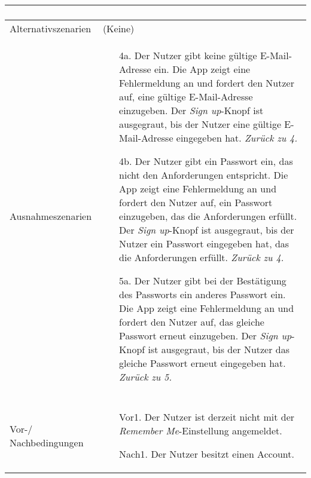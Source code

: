 \begin{table}[H]
\begin{tabularx}{0.95\textwidth}{ |l|X| }
\begin{enumerate}[noitemsep]
		                                         \end{enumerate}                                                                        \\
		\hline
		Alternativszenarien                    & (Keine)                                                                                                                                               \\
		\hline
		Ausnahmeszenarien                      & \begin{enumerate}[noitemsep]
			                                         \item[4a.] Der Nutzer gibt keine gültige E-Mail-Adresse ein.
				                                         \subitem[4a1.] Die App zeigt eine Fehlermeldung an und fordert den Nutzer auf, eine gültige E-Mail-Adresse einzugeben.
				                                         \subitem[4a2.] Der \emph{Sign up}-Knopf ist ausgegraut, bis der Nutzer eine gültige E-Mail-Adresse eingegeben hat. \emph{Zurück zu 4.}
			                                         \item[4b.] Der Nutzer gibt ein Passwort ein, das nicht den Anforderungen entspricht.
				                                         \subitem[4b1.] Die App zeigt eine Fehlermeldung an und fordert den Nutzer auf, ein Passwort einzugeben, das die Anforderungen erfüllt.
				                                         \subitem[4b2.] Der \emph{Sign up}-Knopf ist ausgegraut, bis der Nutzer ein Passwort eingegeben hat, das die Anforderungen erfüllt. \emph{Zurück zu 4.}
			                                         \item[5a.] Der Nutzer gibt bei der Bestätigung des Passworts ein anderes Passwort ein.
				                                         \subitem[5a1.] Die App zeigt eine Fehlermeldung an und fordert den Nutzer auf, das gleiche Passwort erneut einzugeben.
				                                         \subitem[5a2.] Der \emph{Sign up}-Knopf ist ausgegraut, bis der Nutzer das gleiche Passwort erneut eingegeben hat. \emph{Zurück zu 5.}
		                                         \end{enumerate} \\
		\hline
		\rowcolor{lightgray}                   &                                                                                                                                                       \\
		\hline
		Vor-/ Nachbedingungen                  & \begin{enumerate}[noitemsep]
			                                         \item[Vor1.] Der Nutzer ist derzeit nicht mit der \emph{Remember Me}-Einstellung angemeldet.
			                                         \item[Nach1.] Der Nutzer besitzt einen Account.
		                                         \end{enumerate}                                                           \\
		\hline
	\end{tabularx}
\end{table}



